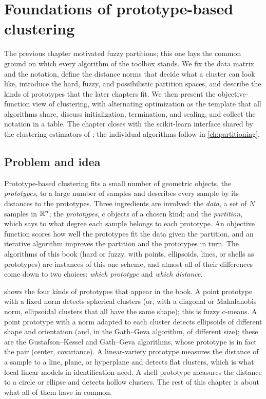 \chapter[Foundations]{Foundations of prototype-based clustering}\label{ch:foundations}
\begin{roadmap}
The previous chapter motivated fuzzy partitions; this one lays the common ground on which every algorithm of the toolbox stands. We fix the data matrix and the notation, define the distance norms that decide what a cluster can look like, introduce the hard, fuzzy, and possibilistic partition spaces, and describe the kinds of prototypes that the later chapters fit. We then present the objective-function view of clustering, with alternating optimization as the template that all algorithms share, discuss initialization, termination, and scaling, and collect the notation in a table. The chapter closes with the scikit-learn interface shared by the clustering estimators of ; the individual algorithms follow in \cref{ch:partitioning}.
\end{roadmap}

\section{Problem and idea}\label{sec:found:problem}

Prototype-based clustering fits a small number of geometric objects, the \emph{prototypes}, to a large number of samples and describes every sample by its distances to the prototypes. Three ingredients are involved: the \emph{data}, a set of $N$ samples in $\mathbb{R}^n$; the \emph{prototypes}, $c$ objects of a chosen kind; and the \emph{partition}, which says to what degree each sample belongs to each prototype. An objective function scores how well the prototypes fit the data given the partition, and an iterative algorithm improves the partition and the prototypes in turn. The algorithms of this book (hard or fuzzy, with points, ellipsoids, lines, or shells as prototypes) are instances of this one scheme, and almost all of their differences come down to two choices: \emph{which prototype} and \emph{which distance}.

 shows the four kinds of prototypes that appear in the book. A point prototype with a fixed norm detects spherical clusters (or, with a diagonal or Mahalanobis norm, ellipsoidal clusters that all have the same shape); this is fuzzy c-means. A point prototype with a norm adapted to each cluster detects ellipsoids of different shape and orientation (and, in the Gath--Geva algorithm, of different size); these are the Gustafson--Kessel and Gath--Geva algorithms, whose prototype is in fact the pair (center, covariance). A linear-variety prototype measures the distance of a sample to a line, plane, or hyperplane and detects flat clusters, which is what local linear models in identification need. A shell prototype measures the distance to a circle or ellipse and detects hollow clusters. The rest of this chapter is about what all of them have in common.

